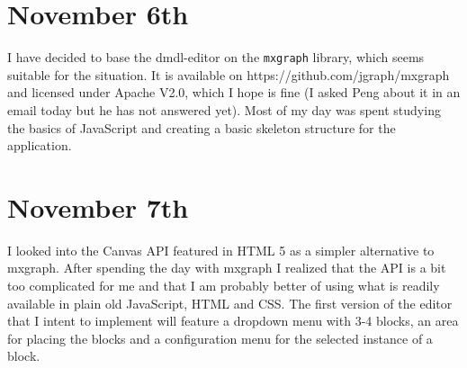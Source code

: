 \documentclass{article}
\begin{document}
\section{November 6th}
I have decided to base the dmdl-editor on the \texttt{mxgraph} library, which seems suitable for the situation.
It is available on https://github.com/jgraph/mxgraph and licensed under Apache V2.0, which I hope is fine (I asked
Peng about it in an email today but he has not answered yet). Most of my day was spent studying the basics of 
JavaScript and creating a basic skeleton structure for the application.

\section{November 7th}
I looked into the Canvas API featured in HTML 5 as a simpler alternative to mxgraph. After spending the day with mxgraph
I realized that the API is a bit too complicated for me and that I am probably better of using what is readily available in
plain old JavaScript, HTML and CSS. The first version of the editor that I intent to implement will feature a dropdown menu
with 3-4 blocks, an area for placing the blocks and a configuration menu for the selected instance of a block.
\end{document}
